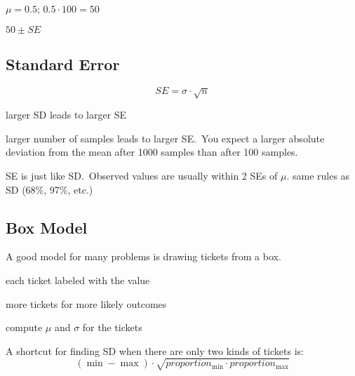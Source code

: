 \documentclass[letterpaper]{exam}
\begin{document}
  \begin{itemize*}
    \item $\mu = 0.5$; $0.5 \cdot 100 = 50$
    \item $50 \pm SE$
  \end{itemize*}

  \subsection{Standard Error}
  \[
    SE = \sigma \cdot \sqrt{n}
  \]

  \begin{itemize*}
    \item larger SD leads to larger SE
    \item larger number of samples leads to larger SE.\ You expect a larger
      absolute deviation from the mean after 1000 samples than after 100
      samples.
    \item SE is just like SD.\ Observed values are usually within 2 SEs of $\mu$.
      same rules as SD (68\%, 97\%, etc.)
  \end{itemize*}

  \subsection{Box Model}
  A good model for many problems is drawing tickets from a box.
  \begin{itemize*}
    \item each ticket labeled with the value
    \item more tickets for more likely outcomes
    \item compute $\mu$ and $\sigma$ for the tickets
  \end{itemize*}

  A shortcut for finding SD when there are only two kinds of tickets is:
  \[
    (\min - \max) \cdot \sqrt{proportion_{\min} \cdot proportion_{\max}}
  \]
\end{document}
